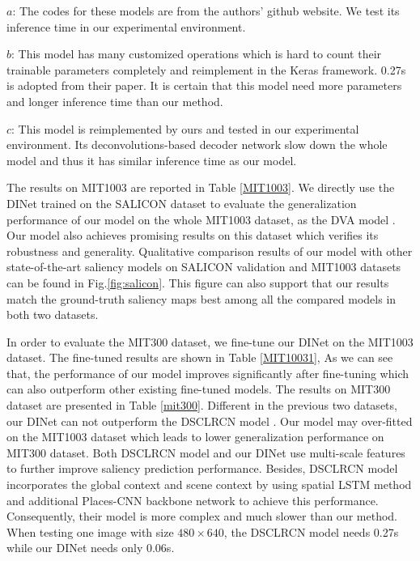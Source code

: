 \begin{table*}[]
\begin{threeparttable}
\begin{tablenotes}
	\item 	$a$: The codes for these models are from the authors' github website. We test its inference time in our experimental environment.
	\item  $b$: This model has many customized operations which is hard to count their trainable parameters completely and reimplement in the Keras framework. 0.27s is adopted from their paper. It is certain that this model need more parameters and longer inference time than our method.
	\item  $c$: This model is reimplemented by ours and tested in our experimental environment. Its deconvolutions-based decoder network slow down the whole model and thus it has similar inference time as our model. 
\end{tablenotes}
\end{threeparttable}
	\vspace{-4mm}

\end{table*}

The results on MIT1003 are reported in Table \ref{MIT1003}. We directly use the DINet trained on the SALICON dataset to evaluate the generalization performance of our model on the whole MIT1003 dataset, as the DVA model \cite{wang2017deep}. Our model also achieves promising results on this dataset which verifies its robustness and generality. Qualitative comparison results of our model with other state-of-the-art saliency models on SALICON validation and MIT1003 datasets can be found in Fig.\ref{fig:salicon}. This figure can also support that our results match the ground-truth saliency maps best among all the compared models in both two datasets.

In order to evaluate the MIT300 dataset, we fine-tune our DINet on the MIT1003 dataset. The fine-tuned results are shown in Table \ref{MIT10031}, As we can see that, the performance of our model improves significantly after fine-tuning which can also outperform other existing fine-tuned models. The results on MIT300 dataset are presented in Table \ref{mit300}. Different in the previous two datasets, our DINet can not outperform the DSCLRCN model \cite{liu2016deep}. Our model may over-fitted on the MIT1003 dataset which leads to lower generalization performance on MIT300 dataset. Both DSCLRCN model and our DINet use multi-scale features to further improve saliency prediction performance. Besides, DSCLRCN model incorporates the global context and scene context by using spatial LSTM \cite{visin2015renet} method and additional Places-CNN \cite{zhou2014learning} backbone network to achieve this performance. Consequently, their model is more complex and much slower than our method. When testing one image with size $480 \times 640$, the DSCLRCN model needs 0.27s while our DINet needs only 0.06s.   


